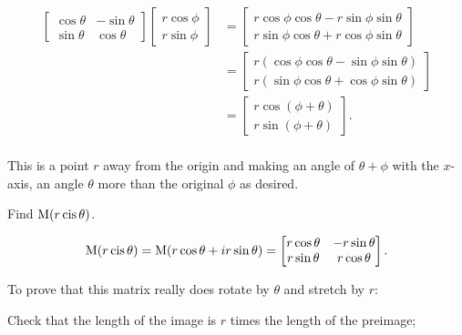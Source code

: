 \documentclass[../key.tex]{subfiles}
\begin{document}
\begin{align*}
\begin{bmatrix} \cos\theta & -\sin\theta \\ \sin\theta & \cos\theta \end{bmatrix} \begin{bmatrix}r\cos\phi \\ r\sin\phi \end{bmatrix} &= \begin{bmatrix} r\cos\phi\cos\theta - r\sin\phi\sin\theta \\ r\sin\phi\cos\theta + r\cos\phi\sin\theta \end{bmatrix} \\
&= \begin{bmatrix} r(\cos\phi\cos\theta - \sin\phi\sin\theta) \\ r(\sin\phi\cos\theta + \cos\phi\sin\theta) \end{bmatrix} \\
&= \begin{bmatrix} r\cos(\phi + \theta) \\ r\sin(\phi + \theta) \end{bmatrix}. \\
\end{align*}

This is a point $r$ away from the origin and making an angle of $\theta + \phi$ with the $x$-axis, an angle $\theta$ more than the original $\phi$ as desired.

\begin{outer_problem}
\item
\end{outer_problem}

\begin{inner_problem}[start=1]
\item Find $\operatorname{M} (r\operatorname{cis}\theta)$.
\end{inner_problem}

$$\operatorname{M} (r\operatorname{cis}\theta) = \operatorname{M}(r\cos\theta + ir\sin\theta) = \begin{bmatrix} r\cos\theta & -r\sin\theta \\ r\sin\theta & r\cos\theta \end{bmatrix}.$$

\begin{inner_problem}
\item To prove that this matrix really does rotate by $\theta$ and stretch by $r$:
\end{inner_problem}

\begin{iinner_problem}[start=1]
\item Check that the length of the image is $r$ times the length of the preimage;
\end{iinner_problem}
\end{document}
